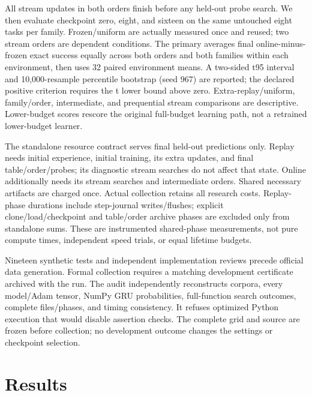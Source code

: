 \documentclass[11pt]{article}
\begin{document}
All stream updates in both orders finish before any held-out probe search.
We then evaluate checkpoint zero, eight, and sixteen on the same untouched
eight tasks per family. Frozen/uniform are actually measured once and reused;
two stream orders are dependent conditions. The primary averages final
online-minus-frozen exact success equally across both orders and both families
within each environment, then uses 32 paired environment means. A two-sided
t95 interval and 10,000-resample percentile bootstrap (seed 967) are reported;
the declared positive criterion requires the t lower bound above zero.
Extra-replay/uniform, family/order, intermediate, and prequential stream
comparisons are descriptive. Lower-budget scores rescore the original
full-budget learning path, not a retrained lower-budget learner.

The standalone resource contract serves final held-out predictions only.
Replay needs initial experience, initial training, its extra updates, and
final table/order/probes; its diagnostic stream searches do not affect that
state. Online additionally needs its stream searches and intermediate orders.
Shared necessary artifacts are charged once. Actual collection retains all
research costs. Replay-phase durations include step-journal writes/flushes;
explicit clone/load/checkpoint and table/order archive phases are excluded
only from standalone sums. These are instrumented shared-phase measurements,
not pure compute times, independent speed trials, or equal lifetime budgets.

Nineteen synthetic tests and independent implementation reviews precede
official data generation. Formal collection requires a matching development
certificate archived with the run. The audit independently reconstructs
corpora, every model/Adam tensor, NumPy GRU probabilities, full-function
search outcomes, complete files/phases, and timing consistency. It refuses
optimized Python execution that would disable assertion checks. The complete
grid and source are frozen before collection; no development outcome changes
the settings or checkpoint selection.

\newpage
\section{Results}
\end{document}
